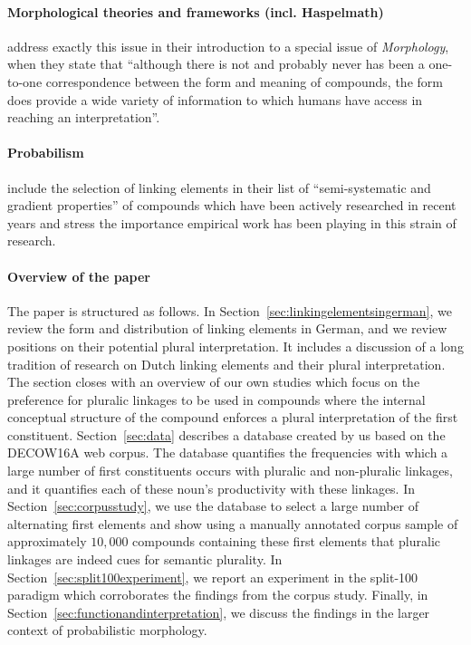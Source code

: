 \paragraph{Morphological theories and frameworks (incl. Haspelmath)}

\textcite[107]{ArndtlappeEa2016} address exactly this issue in their introduction to a special issue of \textit{Morphology}, when they state that ``although there is not and probably never has been a one-to-one correspondence between the form and meaning of compounds, the form does provide a wide variety of information to which humans have access in reaching an interpretation''.


\paragraph{Probabilism}


\textcite[105]{ArndtlappeEa2016} include the selection of linking elements in their list of ``semi-systematic and gradient properties'' of compounds which have been actively researched in recent years and stress the importance empirical work has been playing in this strain of research.


\paragraph{Overview of the paper}

The paper is structured as follows.
In Section~\ref{sec:linkingelementsingerman}, we review the form and distribution of linking elements in German, and we review positions on their potential plural interpretation.
It includes a discussion of a long tradition of research on Dutch linking elements and their plural interpretation.
The section closes with an overview of our own studies which focus on the preference for pluralic linkages to be used in compounds where the internal conceptual structure of the compound enforces a plural interpretation of the first constituent.
Section~\ref{sec:data} describes a database created by us based on the DECOW16A web corpus.
The database quantifies the frequencies with which a large number of first constituents occurs with pluralic and non-pluralic linkages, and it quantifies each of these noun's productivity with these linkages.
In Section~\ref{sec:corpusstudy}, we use the database to select a large number of alternating first elements and show using a manually annotated corpus sample of approximately $10,000$ compounds containing these first elements that pluralic linkages are indeed cues for semantic plurality.
In Section~\ref{sec:split100experiment}, we report an experiment in the split-100 paradigm which corroborates the findings from the corpus study.
Finally, in Section~\ref{sec:functionandinterpretation}, we discuss the findings in the larger context of probabilistic morphology.
